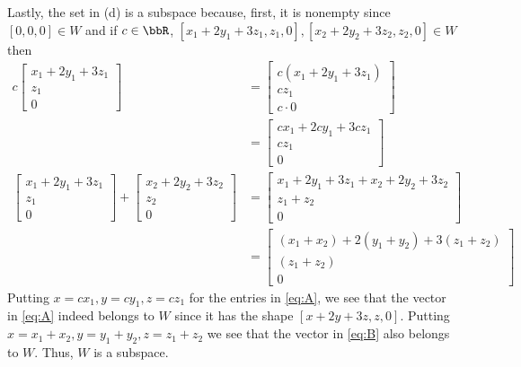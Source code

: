 \begin{questions}
\begin{solution}
    Lastly, the set in (d) is a subspace because, first, it is nonempty
    since $[0,0,0]\in W$ and if $c\in\bbR$, $[x_1+2y_1+3z_1,z_1,0],[x_2+2y_2+3z_2,z_2,0]\in
    W$ then
    \begin{align*}
      c\begin{bmatrix}
        x_1+2y_1+3z_1\\
        z_1\\
        0
      \end{bmatrix}
      &=\begin{bmatrix}
        c(x_1+2y_1+3z_1)\\
        cz_1\\
        c\cdot 0
      \end{bmatrix}\\
      &=\begin{bmatrix}
        cx_1+2cy_1+3cz_1\\
        cz_1\\
        0
      \end{bmatrix}\label{eq:A}\tag{$\clubsuit$}\\
            \begin{bmatrix}
        x_1+2y_1+3z_1\\
        z_1\\
        0
      \end{bmatrix}+
      \begin{bmatrix}
        x_2+2y_2+3z_2\\
        z_2\\
        0
      \end{bmatrix}
     &=\begin{bmatrix}
       x_1+2y_1+3z_1+x_2+2y_2+3z_2\\
       z_1+z_2\\
       0
     \end{bmatrix}\\
      &=\begin{bmatrix}
        (x_1+x_2)+2(y_1+y_2)+3(z_1+z_2)\\
        (z_1+z_2)\\
        0
      \end{bmatrix}\label{eq:B}\tag{$\spadesuit$}
    \end{align*}
    Putting $x=cx_1,y=cy_1,z=cz_1$ for the entries in \eqref{eq:A}, we see
    that the vector in \eqref{eq:A} indeed belongs to $W$ since it has the
    shape $[x+2y+3z,z,0]$. Putting $x=x_1+x_2,y=y_1+y_2,z=z_1+z_2$ we see
    that the vector in \eqref{eq:B} also belongs to $W$. Thus, $W$ is a
    subspace.
  \end{solution}

\end{questions}

